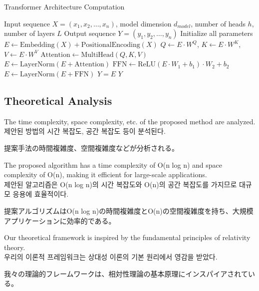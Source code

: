 \documentclass[12pt,a4paper]{article}
\begin{document}
\begin{algorithm}
\caption{Transformer Architecture Computation}
\label{alg:transformer}
\begin{algorithmic}[1]
\REQUIRE Input sequence $X = (x_1, x_2, \ldots, x_n)$, model dimension $d_{model}$, number of heads $h$, number of layers $L$
\ENSURE Output sequence $Y = (y_1, y_2, \ldots, y_n)$
\STATE Initialize all parameters
\STATE $E \leftarrow \text{Embedding}(X) + \text{PositionalEncoding}(X)$
    \STATE $Q \leftarrow E \cdot W^Q$, $K \leftarrow E \cdot W^K$, $V \leftarrow E \cdot W^V$
    \STATE $\text{Attention} \leftarrow \text{MultiHead}(Q, K, V)$
    \STATE $E \leftarrow \text{LayerNorm}(E + \text{Attention})$
    \STATE $\text{FFN} \leftarrow \text{ReLU}(E \cdot W_1 + b_1) \cdot W_2 + b_2$
    \STATE $E \leftarrow \text{LayerNorm}(E + \text{FFN})$
\ENDFOR
\STATE $Y = E$ 
\RETURN $Y$
\end{algorithmic}
\end{algorithm}

\subsection{Theoretical Analysis}
The time complexity, space complexity, etc. of the proposed method are analyzed. \\
제안된 방법의 시간 복잡도, 공간 복잡도 등이 분석된다. \\
\begin{CJK}{UTF8}{min}
提案手法の時間複雑度、空間複雑度などが分析される。
\end{CJK}

The proposed algorithm has a time complexity of O(n log n) and space complexity of O(n), making it efficient for large-scale applications. \\
제안된 알고리즘은 O(n log n)의 시간 복잡도와 O(n)의 공간 복잡도를 가지므로 대규모 응용에 효율적이다. \\
\begin{CJK}{UTF8}{min}
提案アルゴリズムはO(n log n)の時間複雑度とO(n)の空間複雑度を持ち、大規模アプリケーションに効率的である。
\end{CJK}

Our theoretical framework is inspired by the fundamental principles of relativity theory. \\
우리의 이론적 프레임워크는 상대성 이론의 기본 원리에서 영감을 받았다. \\
\begin{CJK}{UTF8}{min}
我々の理論的フレームワークは、相対性理論の基本原理にインスパイアされている。
\end{CJK}
\end{document}
